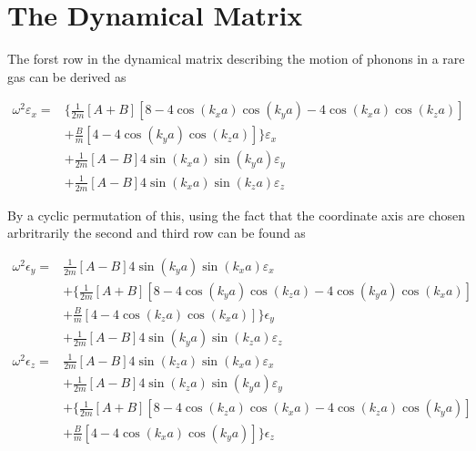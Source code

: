 \section{The Dynamical Matrix}

The forst row in the dynamical matrix describing the motion of phonons in a rare gas can be derived as

\begin{equation}
  \label{eq:dynfirst}
\begin{aligned}
\omega^2\varepsilon_x = & \Big \{ \frac{1}{2m}[A+B][8-4\cos (k_x a)\cos (k_y a)-4\cos (k_x a)\cos (k_z a)] \\
 & + \frac{B}{m}[4-4\cos (k_y a)\cos (k_z a)] \Big \} \varepsilon_x \\
 & + \frac{1}{2m}[A-B]4\sin (k_x a)\sin (k_y a) \varepsilon_y \\
 & + \frac{1}{2m}[A-B]4\sin (k_x a)\sin (k_z a) \varepsilon_z
\end{aligned}
\end{equation}

By a cyclic permutation of this, using the fact that the coordinate axis are chosen arbritrarily the second and third row can be found as

\begin{equation*}
\begin{aligned}
 \omega^2\epsilon_y = & \frac{1}{2m}[A-B]4\sin (k_y a)\sin (k_x a) \varepsilon_x\\
&+ \Big \{ \frac{1}{2m}[A+B][8-4\cos (k_y a)\cos (k_z a)-4\cos (k_y a)\cos (k_x a)] \\
 & + \frac{B}{m}[4-4\cos (k_z a)\cos (k_x a)] \Big \} \epsilon_y \\
 & + \frac{1}{2m}[A-B]4\sin (k_y a)\sin (k_z a) \varepsilon_z \\
 \omega^2\epsilon_z =& \frac{1}{2m}[A-B]4\sin (k_z a)\sin (k_x a) \varepsilon_x \\
  & + \frac{1}{2m}[A-B]4\sin (k_z a)\sin (k_y a) \varepsilon_y\\
&+ \Big \{ \frac{1}{2m}[A+B][8-4\cos (k_z a)\cos (k_x a)-4\cos (k_z a)\cos (k_y a)] \\
 & + \frac{B}{m}[4-4\cos (k_x a)\cos (k_y a)] \Big \} \epsilon_z \\
\end{aligned}
\end{equation*}
